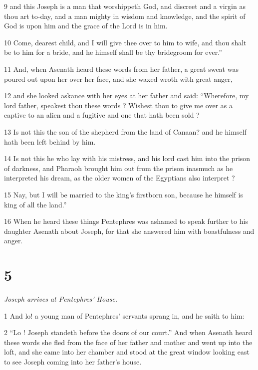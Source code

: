 \par 9 and this Joseph is a man that worshippeth God, and discreet and a virgin as thou art to-day, and a man mighty in wisdom and knowledge, and the spirit of God is upon him and the grace of the Lord is in him. 

\par 10 Come, dearest child, and I will give thee over to him to wife, and thou shalt be to him for a bride, and he himself shall be thy bridegroom for ever.”

\par 11 And, when Asenath heard these words from her father, a great sweat was poured out upon her over her face, and she waxed wroth with great anger, 

\par 12 and she looked askance with her eyes at her father and said: “Wherefore, my lord father, speakest thou these words ? Wishest thou to give me over as a captive to an alien and a fugitive and one that hath been sold ? 

\par 13 Is not this the son of the shepherd from the land of Canaan? and he himself hath been left behind by him. 

\par 14 Is not this he who lay with his mistress, and his lord cast him into the prison of darkness, and Pharaoh brought him out from the prison inasmuch as he interpreted his dream, as the older women of the Egyptians also interpret ? 

\par 15 Nay, but I will be married to the king's firstborn son, because he himself is king of all the land.” 

\par 16 When he heard these things Pentephres was ashamed to speak further to his daughter Asenath about Joseph, for that she answered him with boastfulness and anger. 

\chapter{5}

\textit{Joseph arrives at Pentephres' House.}

\par 1 And lo! a young man of Pentephres' servants sprang in, and he saith to him: 

\par 2 “Lo ! Joseph standeth before the doors of our court.” And when Asenath heard these words she fled from the face of her father and mother and went up into the loft, and she came into her chamber and stood at the great window looking east to see Joseph coming into her father's house. 

